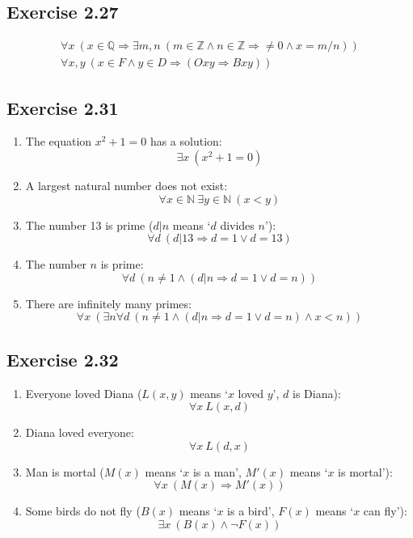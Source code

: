 \documentclass[leqno]{article}
\renewcommand{\implies}{\Rightarrow}
\begin{document}
\subsection*{Exercise 2.27}
\setcounter{equation}{0}
\begin{gather}
  \forall x ~ (x \in \mathbb{Q} \implies
  \exists m,n ~ (m \in \mathbb{Z} \land n \in \mathbb{Z} \implies
  \neq 0 \land x = m/n))
  \\
  \forall x,y ~ (x \in F \land y \in D \implies (Oxy \implies Bxy))
\end{gather}

\subsection*{Exercise 2.31}
\begin{enumerate}
  \item
  The equation $x^2 + 1 = 0$ has a solution:
  \[ \exists x~(x^2 + 1 = 0) \]

  \item
  A largest natural number does not exist:
  \[ \forall x \in \mathbb{N}~\exists y \in \mathbb{N}~(x < y) \]

  \item
  The number 13 is prime ($d|n$ means `$d$ divides $n$'):
  \[ \forall d~(d|13 \implies d = 1 \lor d = 13) \]

  \item
  The number $n$ is prime:
  \[ \forall d~(n \neq 1 \land (d|n \implies d = 1 \lor d = n)) \]

  \item
  There are infinitely many primes:
  \[ \forall x~(\exists n \forall d~
   (n \neq 1 \land (d|n \implies d = 1 \lor d = n) \land x < n)) \]
\end{enumerate}

\subsection*{Exercise 2.32}
\begin{enumerate}
  \item
  Everyone loved Diana ($L(x,y)$ means `$x$ loved $y$', $d$ is Diana):
  \[ \forall x ~ L(x,d) \]

  \item
  Diana loved everyone: \\
  \[ \forall x ~ L(d,x) \]

  \item
  Man is mortal ($M(x)$ means `$x$ is a man', $M'(x)$ means `$x$ is mortal'):
  \[ \forall x ~ (M(x) \implies M'(x)) \]

  \item
  Some birds do not fly ($B(x)$ means `$x$ is a bird', $F(x)$ means `$x$ can fly'):
  \[ \exists x ~ (B(x) \land \neg F(x)) \]
\end{enumerate}
\end{document}
